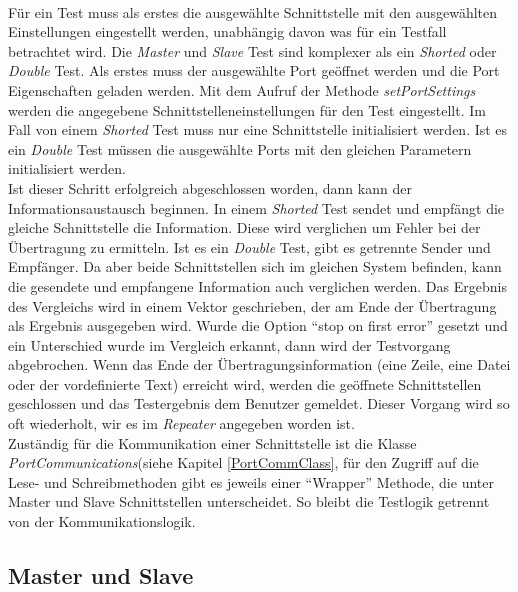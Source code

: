 \paragraph{}
Für ein Test muss als erstes die ausgewählte Schnittstelle mit den ausgewählten Einstellungen eingestellt werden, unabhängig davon was für ein Testfall betrachtet wird. Die \textit{Master} und \textit{Slave} Test sind komplexer als ein \textit{Shorted} oder \textit{Double} Test. Als erstes muss der ausgewählte Port geöffnet werden und die Port Eigenschaften geladen werden. Mit dem Aufruf der Methode \textit{setPortSettings} werden die angegebene Schnittstelleneinstellungen für den Test eingestellt. Im Fall von einem \textit{Shorted} Test muss nur eine Schnittstelle initialisiert werden. Ist es ein \textit{Double} Test müssen die ausgewählte Ports mit den gleichen Parametern initialisiert werden.\\

Ist dieser Schritt erfolgreich abgeschlossen worden, dann kann der Informationsaustausch beginnen. In einem \textit{Shorted} Test sendet und empfängt die gleiche Schnittstelle die Information. Diese wird verglichen um Fehler bei der Übertragung zu ermitteln. Ist es ein \textit{Double} Test, gibt es getrennte Sender und Empfänger. Da aber beide Schnittstellen sich im gleichen System befinden, kann die gesendete und empfangene Information auch verglichen werden. Das Ergebnis des Vergleichs wird in einem Vektor geschrieben, der am Ende der Übertragung als Ergebnis ausgegeben wird. Wurde die Option "`stop on first error"' gesetzt und ein Unterschied wurde im Vergleich erkannt, dann wird der Testvorgang abgebrochen. Wenn das Ende der Übertragungsinformation (eine Zeile, eine Datei oder der vordefinierte Text) erreicht wird, werden die geöffnete Schnittstellen geschlossen und das Testergebnis dem Benutzer gemeldet. Dieser Vorgang wird so oft wiederholt, wir es im \textit{Repeater} angegeben worden ist.\\

Zuständig für die Kommunikation einer Schnittstelle ist die Klasse \textit{PortCommunications}(siehe Kapitel \ref{PortCommClass}, für den Zugriff auf die Lese- und Schreibmethoden gibt es jeweils einer "`Wrapper"' Methode, die unter Master und Slave Schnittstellen unterscheidet. So bleibt die Testlogik getrennt von der Kommunikationslogik.

\subsection{Master und Slave}
